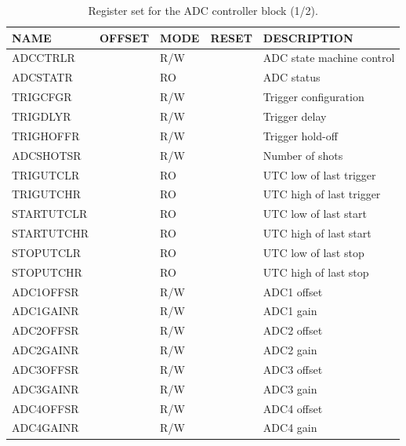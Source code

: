 \documentclass{article}
\begin{document}
\begin{table}[htbp]
  \centering
  \begin{tabularx}{\textwidth}{|l|r|l|l|X|}
    \hline
    \textbf{NAME} & \textbf{OFFSET} & \textbf{MODE} & \textbf{RESET} & \textbf{DESCRIPTION} \\
    \hline
    \hline
    ADCCTRLR & & R/W & & ADC state machine control\\
    \hline
    ADCSTATR & & RO & & ADC status \\
    \hline
    TRIGCFGR & & R/W & & Trigger configuration \\
    \hline
    TRIGDLYR & & R/W & & Trigger delay \\
    \hline
    TRIGHOFFR & & R/W & & Trigger hold-off \\
    \hline
    ADCSHOTSR & & R/W & & Number of shots \\
    \hline
    TRIGUTCLR & & RO & & UTC low of last trigger \\
    \hline
    TRIGUTCHR & & RO & & UTC high of last trigger \\
    \hline
    STARTUTCLR & & RO & & UTC low of last start \\
    \hline
    STARTUTCHR & & RO & & UTC high of last start \\
    \hline
    STOPUTCLR & & RO & & UTC low of last stop \\
    \hline
    STOPUTCHR & & RO & & UTC high of last stop \\
    \hline
    ADC1OFFSR & & R/W & & ADC1 offset \\
    \hline
    ADC1GAINR & & R/W & & ADC1 gain \\
    \hline
    ADC2OFFSR & & R/W & & ADC2 offset \\
    \hline
    ADC2GAINR & & R/W & & ADC2 gain \\
    \hline
    ADC3OFFSR & & R/W & & ADC3 offset \\
    \hline
    ADC3GAINR & & R/W & & ADC3 gain \\
    \hline
    ADC4OFFSR & & R/W & & ADC4 offset \\
    \hline
    ADC4GAINR & & R/W & & ADC4 gain \\
    \hline
  \end{tabularx}
  \caption{Register set for the ADC controller block (1/2).}
  \label{tab:adc_control1}
\end{table}
\end{document}
